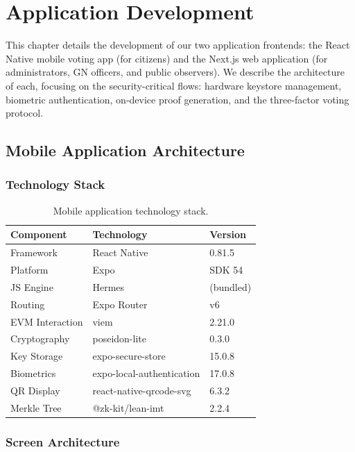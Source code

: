 \chapter{Application Development}\label{ch:applications}

This chapter details the development of our two application frontends: the React Native mobile voting app (for citizens) and the Next.js web application (for administrators, GN officers, and public observers). We describe the architecture of each, focusing on the security-critical flows: hardware keystore management, biometric authentication, on-device proof generation, and the three-factor voting protocol.

\section{Mobile Application Architecture}

\subsection{Technology Stack}

\begin{table}[H]
\centering
\caption{Mobile application technology stack.}
\label{tab:mobile-stack}
\begin{tabular}{|l|l|l|}
\hline
\textbf{Component} & \textbf{Technology} & \textbf{Version} \\
\hline
Framework & React Native & 0.81.5 \\
\hline
Platform & Expo & SDK 54 \\
\hline
JS Engine & Hermes & (bundled) \\
\hline
Routing & Expo Router & v6 \\
\hline
EVM Interaction & viem & 2.21.0 \\
\hline
Cryptography & poseidon-lite & 0.3.0 \\
\hline
Key Storage & expo-secure-store & 15.0.8 \\
\hline
Biometrics & expo-local-authentication & 17.0.8 \\
\hline
QR Display & react-native-qrcode-svg & 6.3.2 \\
\hline
Merkle Tree & @zk-kit/lean-imt & 2.2.4 \\
\hline
\end{tabular}
\end{table}

\subsection{Screen Architecture}

